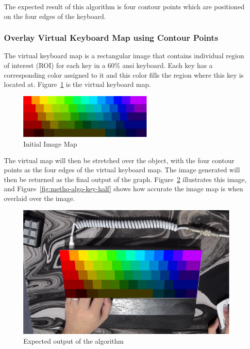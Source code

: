 \documentclass{report}
\begin{document}
The expected result of this algorithm is four contour points which are
positioned on the four edges of the keyboard.

\subsubsection{Overlay Virtual Keyboard Map using Contour Points}
The virtual keyboard map is a rectangular image that contains individual region
of interest (ROI) for each key in a 60\% \ac{ansi} keyboard. Each key has a
corresponding color assigned to it and this color fills the region where this
key is located at. Figure~\ref{fig:metho-algo-key-map} is the virtual keyboard
map.

\begin{figure}[H]
	\centering
	\includegraphics[width=0.6\textwidth]{image-map.png}
	\caption{Initial Image Map}
	\label{fig:metho-algo-key-map}
	\centering
\end{figure}

The virtual map will then be stretched over the object, with the four contour
points as the four edges of the virtual keyboard map. The image generated will
then be returned as the final output of the graph.
Figure~\ref{fig:metho-algo-key-overlay} illustrates this image, and
Figure~\ref{fig:metho-algo-key-half} shows how accurate the image map is when
overlaid over the image.

\begin{figure}[H]
	\centering
	\includegraphics[width=1\textwidth]{image-map-final.png}
	\caption{Expected output of the algorithm}
	\label{fig:metho-algo-key-overlay}
	\centering
\end{figure}
\end{document}
